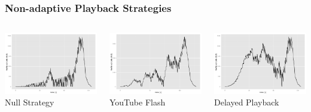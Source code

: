 \documentclass{beamer}
\begin{document}

\begin{frame}
	\frametitle{Non-adaptive Playback Strategies}
	\begin{columns}[T]
			\centering
			\includegraphics[width=0.75\columnwidth]{../../chapters/03-streaming/images/R-bufferlevel-stall.pdf}\\
			Null Strategy

			\includegraphics[width=0.75\columnwidth]{../../chapters/03-streaming/images/R-bufferlevel-flash.pdf}\\
			YouTube Flash

			\centering
			\includegraphics[width=0.75\columnwidth]{../../chapters/03-streaming/images/R-bufferlevel-startdelay.pdf}\\
			Delayed Playback


\end{columns}
\end{frame}
\end{document}
